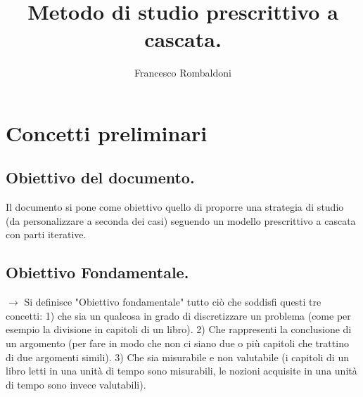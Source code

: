 \documentclass[11pt,a4paper]{article}
\begin{document}
\title{Metodo di studio prescrittivo a cascata.}
\author{Francesco Rombaldoni}
\date{}
\maketitle
\newpage

\section{Concetti preliminari}
 \subsection{Obiettivo del documento. }
Il documento si pone come obiettivo quello di proporre una strategia di studio (da personalizzare a seconda dei casi) seguendo un modello prescrittivo a cascata con parti iterative.\\

\subsection{Obiettivo Fondamentale.}
$\rightarrow$ Si definisce "Obiettivo fondamentale" tutto ciò che soddisfi questi tre concetti: 1)  che sia un qualcosa in grado di discretizzare un problema (come per esempio la divisione in capitoli di un libro). 2) Che rappresenti la conclusione di un argomento (per fare in modo che non ci siano due o più capitoli che trattino di due argomenti simili). 3) Che sia misurabile e non valutabile (i capitoli di un libro letti in una unità di tempo sono misurabili, le nozioni acquisite in una unità di tempo sono invece valutabili).\\
\end{document}
